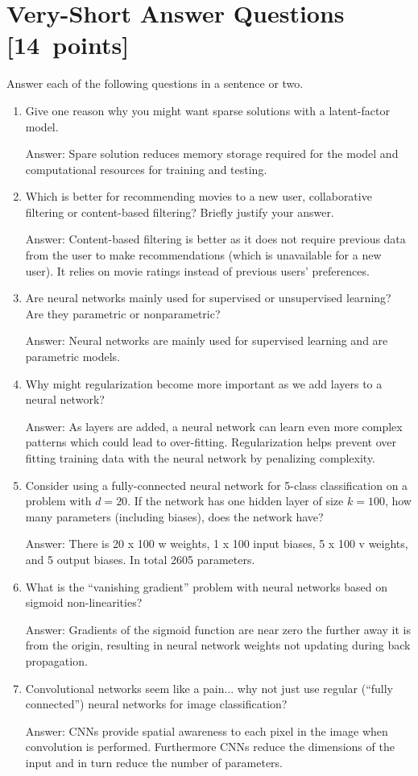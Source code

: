 \documentclass{article}
\newcommand{\blu}[1]{{\textcolor{blu}{#1}}}
\newcommand{\gre}[1]{\textcolor{gre}{#1}}
\newcommand\ans[1]{\par\gre{Answer: #1}}
\let\ask\blu
\newcommand\pts[1]{\textcolor{pointscolour}{[#1~points]}}
\begin{document}
\section{Very-Short Answer Questions \pts{14}}

\ask{Answer each of the following questions in a sentence or two.}
\begin{enumerate}

\item Give one reason why you might want sparse solutions with a latent-factor model.

\ans{Spare solution reduces memory storage required for the model and computational resources for training and testing.}

\item Which is better for recommending movies to a new user, collaborative filtering or content-based filtering? Briefly justify your answer.

\ans{Content-based filtering is better as it does not require previous data from the user to make recommendations (which is unavailable for a new user). It relies on movie ratings instead of previous users' preferences.}

\item{Are neural networks mainly used for supervised or unsupervised learning? Are they parametric or nonparametric?}

\ans{Neural networks are mainly used for supervised learning and are parametric models.}

\item{Why might regularization become more important as we add layers to a neural network?}

\ans{As layers are added, a neural network can learn even more complex patterns which could lead to over-fitting. Regularization helps prevent over fitting training data with the neural network by penalizing complexity.}

\item{Consider using a fully-connected neural network for 5-class classification on a problem with $d=20$. If the network has one hidden layer of size $k=100$, how many parameters (including biases), does the network have?}

\ans{ There is 20 x 100 w weights, 1 x 100 input biases, 5 x 100 v weights, and 5 output biases. In total 2605 parameters. }

\item What is the ``vanishing gradient'' problem with neural networks based on sigmoid non-linearities?

\ans{Gradients of the sigmoid function are near zero the further away it is from the origin, resulting in neural network weights not updating during back propagation. }

\item{Convolutional networks seem like a pain... why not just use regular (``fully connected'') neural networks for image classification?}

\ans{CNNs provide spatial awareness to each pixel in the image when convolution is performed. Furthermore CNNs reduce the dimensions of the input and in turn reduce the number of parameters.}

\end{enumerate}
\end{document}
